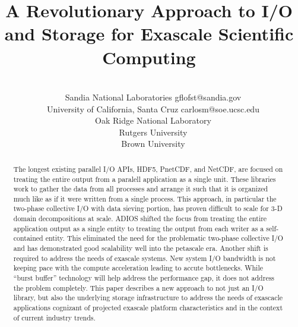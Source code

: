 \documentclass{sig-alt-gov2}
\begin{document}

\title{A Revolutionary Approach to I/O and Storage for Exascale Scientific Computing}

\author{
\\
\footnotemark[1]~~Sandia National Laboratories gflofst@sandia.gov\\
\footnotemark[2]~~University of California, Santa Cruz carlosm@soe.ucsc.edu\\
\footnotemark[3]~~Oak Ridge National Laboratory\\
\footnotemark[4]~~Rutgers University\\
\footnotemark[5]~~Brown University\\
}
\maketitle

\begin{abstract}

The longest existing parallel I/O APIs, HDF5, PnetCDF, and NetCDF, are focused
on treating the entire output from a paralell application as a single unit.
These libraries work to gather the data from all processes and arrange it such
that it is organized much like as if it were written from a single process.
This approach, in particular the two-phase collective I/O with data sieving
portion, has proven difficult to scale for 3-D domain decompositions at scale.
ADIOS shifted the focus from treating the entire application output as a single
entity to treating the output from each writer as a self-contained entity. This
eliminated the need for the problematic two-phase collective I/O and has
demonstrated good scalability well into the petascale era. Another shift is
required to address the needs of exascale systems. New system I/O bandwidth is
not keeping pace with the compute acceleration leading to accute bottlenecks.
While ``burst buffer'' technology will help address the performance gap, it
does not address the problem completely. This paper describes a new approach
to not just an I/O library, but also the underlying storage infrastructure to
address the needs of exascacle applications cognizant of projected exascale
platform characteristics and in the context of current industry trends.

\end{abstract}
\end{document}
